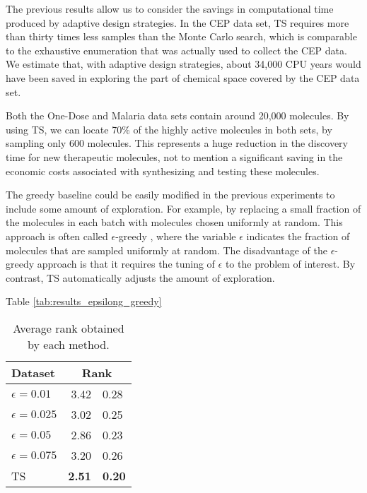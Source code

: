 The previous results allow us to consider the savings in computational time produced by adaptive design strategies. In the CEP data set, TS requires more than thirty times less samples than the Monte Carlo search, which is comparable to the exhaustive enumeration that was actually used to collect the CEP data. We estimate that, with adaptive design strategies, about 34,000 CPU years would have been saved in exploring the part of chemical space covered by the CEP data set. 

Both the One-Dose and Malaria data sets contain around 20,000 molecules. By using TS, we can locate 70\% of the highly active molecules in both sets, by sampling only 600 molecules. This represents a huge reduction in the discovery time for new therapeutic molecules, not to mention a significant saving in the economic costs associated with synthesizing and testing these molecules.

The greedy baseline could be easily modified in the previous experiments to include some amount of exploration. For example, by replacing a small fraction of the molecules in each batch with molecules chosen uniformly at random. This approach is often called $\epsilon$-greedy \cite{watkins1989learning}, where the variable $\epsilon$ indicates the fraction of molecules that are sampled uniformly at random. The disadvantage of the $\epsilon$-greedy approach is that it requires the tuning of $\epsilon$ to the problem of interest. By contrast, TS automatically adjusts the amount of exploration. 

Table \ref{tab:results_epsilong_greedy}

\begin{table}
\centering
\caption{Average rank obtained by each method.}\label{tab:results_epsilon_greedy}
\begin{tabular}{lr@{$\pm$}l}
\hline
\bf{Dataset}& \multicolumn{2}{c}{\bf{Rank}}\\
\hline
$\epsilon = 0.01$ & 3.42 & 0.28 \\
$\epsilon = 0.025$ & 3.02 & 0.25 \\
$\epsilon = 0.05$ & 2.86 & 0.23 \\
$\epsilon = 0.075$ & 3.20 & 0.26 \\
TS & \bf{ 2.51 }&\bf{ 0.20 } \\
\hline
\end{tabular}
\end{table}
